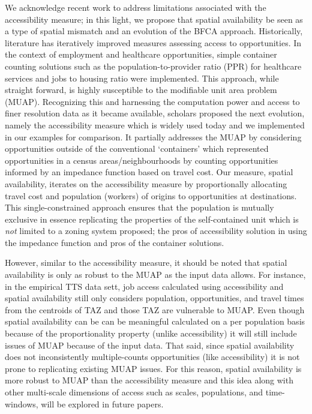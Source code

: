 \documentclass[]{elsarticle} %
\begin{document}
We acknowledge recent work to address limitations associated with the
accessibility measure; in this light, we propose that spatial
availability be seen as a type of spatial mismatch and an evolution of
the BFCA approach. Historically, literature has iteratively improved
measures assessing access to opportunities. In the context of employment
and healthcare opportunities, simple container counting solutions such
as the population-to-provider ratio (PPR) for healthcare services and
jobs to housing ratio were implemented. This approach, while straight
forward, is highly susceptible to the modifiable unit area problem
(MUAP). Recognizing this and harnessing the computation power and access
to finer resolution data as it became available, scholars proposed the
next evolution, namely the accessibility measure which is widely used
today and we implemented in our examples for comparison. It partially
addresses the MUAP by considering opportunities outside of the
conventional `containers' which represented opportunities in a census
areas/neighbourhoods by counting opportunities informed by an impedance
function based on travel cost. Our measure, spatial availability,
iterates on the accessibility measure by proportionally allocating
travel cost and population (workers) of origins to opportunities at
destinations. This single-constrained approach ensures that the
population is mutually exclusive in essence replicating the properties
of the self-contained unit which is \emph{not} limited to a zoning
system proposed; the pros of accessibility solution in using the
impedance function and pros of the container solutions.

However, similar to the accessibility measure, it should be noted that
spatial availability is only as robust to the MUAP as the input data
allows. For instance, in the empirical TTS data sett, job access
calculated using accessibility and spatial availability still only
considers population, opportunities, and travel times from the centroids
of TAZ and those TAZ are vulnerable to MUAP. Even though spatial
availability can be can be meaningful calculated on a per population
basis because of the proportionality property (unlike accessibility) it
will still include issues of MUAP because of the input data. That said,
since spatial availability does not inconsistently multiple-counts
opportunities (like accessibility) it is not prone to replicating
existing MUAP issues. For this reason, spatial availability is more
robust to MUAP than the accessibility measure and this idea along with
other multi-scale dimensions of access such as scales, populations, and
time-windows, will be explored in future papers.
\end{document}
